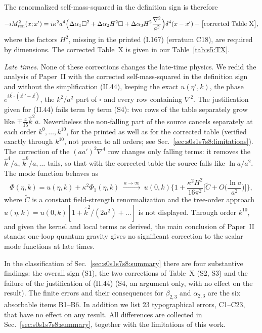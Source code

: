 \documentclass[aps,prd,onecolumn,10pt,nofootinbib,floatfix]{revtex4-2}
\newcommand{\eqI}[1]{(I.#1)}
\newcommand{\eqII}[1]{(II.#1)}
\begin{document}
The renormalized self-mass-squared in the definition sign is therefore
\begin{equation}
-iM^2_{\rm ren}(x;x')=i\kappa^2a^4\Big(\Delta\alpha_1\square^2+\Delta\alpha_2H^2\square+\Delta\alpha_3H^2\frac{\nabla^2}{a^2}\Big)
\delta^4(x-x')-\big[\text{corrected Table X}\big],
\label{eq:s0s1s7s8:Mren}
\end{equation}
where the factors $H^2$, missing in the printed \eqI{167} (erratum C18), are required by dimensions. The corrected Table~X is given in
our Table~\ref{tab:s5:TX}.

\emph{Late times.} None of these corrections changes the late-time physics. We redid the analysis of Paper~II with the corrected
self-mass-squared in the definition sign and without the simplification \eqII{44}, keeping the exact $u(\eta',k)$, the phase
$e^{i\vec k\cdot(\vec x\,'-\vec x)}$, the $k^2/a^2$ part of $\square$ and every row containing $\nabla^2$. The justification given for
\eqII{44} fails term by term (S4): two rows of the table separately grow like $\mp\tfrac{4}{15}\hat k^2a$. Nevertheless the non-falling part
of the source cancels separately at each order $k^0,\dots,k^{10}$, for the printed as well as for the corrected table (verified
exactly through $k^{10}$, not proven to all orders; see Sec.~\ref{sec:s0s1s7s8:limitations}). The correction of the
$(aa')^2\nabla^4$ row changes only falling terms: it removes the $\hat k^4/a$, $\hat k^6/a,\dots$ tails, so that with the corrected
table the source falls like $\ln a/a^2$. The mode
function behaves as
\begin{equation}
\Phi(\eta,k)=u(\eta,k)+\kappa^2\Phi_1(\eta,k)\ \xrightarrow{\ a\to\infty\ }\ u(0,k)\Big\{1+\frac{\kappa^2H^2}{16\pi^2}\Big[\tilde C
+O\Big(\frac{\ln a}{a^2}\Big)\Big]\Big\},
\label{eq:s0s1s7s8:late}
\end{equation}
where $\tilde C$ is a constant field-strength renormalization and the tree-order approach $u(\eta,k)=u(0,k)[1+\hat k^2/(2a^2)+\dots]$
is not displayed. Through order $k^{10}$, and given the kernel and local terms as derived, the main conclusion of Paper~II stands:
one-loop quantum gravity gives no significant correction to the scalar mode functions at late times.

In the classification of Sec.~\ref{sec:s0s1s7s8:summary} there are four substantive findings: the overall sign (S1), the two
corrections of Table~X (S2, S3) and the failure of the justification of \eqII{44} (S4, an argument only, with no effect on the
result). The finite errors and their consequences for $\beta_{2,3}$ and $\alpha_{2,3}$ are the six absorbable items B1--B6. In
addition we list 23 typographical errors, C1--C23, that have no effect on any result. All differences are collected in
Sec.~\ref{sec:s0s1s7s8:summary}, together with the limitations of this work.
\end{document}
